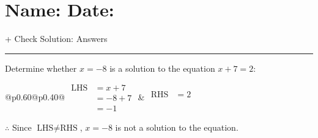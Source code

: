 \documentclass[12pt]{article}
\def \HeadingAnswers {\section*{\Large Name: \underline{\hspace{8cm}} \hfill Date: \underline{\hspace{3cm}}} \vspace{-3mm}
{+ Check Solution: Answers} \vspace{1pt}\hrule}
\newcounter{minipagecount}
\begin{document}
\HeadingAnswers
\vspace{1pt}
\begin{multicols}{2}
\noindent{(\theminipagecount)}\hspace{0.1mm} %
\begin{minipage}[t]{0.40\textwidth} %

    \noindent Determine whether \(x = -8\) is a solution to the equation \(x + 7 = 2\):
    \vspace{4pt}  %

    \noindent
    \renewcommand{\arraystretch}{1.3} %
    \begin{tabular}{@{}p{0.60\linewidth}@{}p{0.40\linewidth}@{}}
        \(\begin{aligned}
            \text{LHS} &= x + 7 \\
                    &= -8 + 7 \\
                    &= -1
        \end{aligned}\) &
        \(\begin{aligned}
            \text{RHS} &= 2\\
                    & \\
                    &
        \end{aligned}\)
    \end{tabular}
    \renewcommand{\arraystretch}{1.0} %
    \vspace{2pt}  %

    \noindent \(\therefore\) Since \(\text{LHS} \neq \text{RHS}\), \(x = -8\) is not  a solution to the equation.

\end{minipage}

 \vspace*{16pt}
\noindent{(\theminipagecount)}\hspace{0.1mm} %
\begin{minipage}[t]{0.40\textwidth} %


\end{minipage}
\end{multicols}
\end{document}
